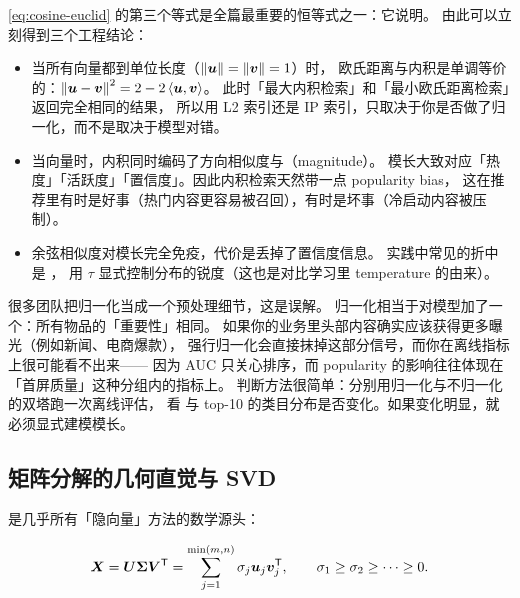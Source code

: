 \cref{eq:cosine-euclid} 的第三个等式是全篇最重要的恒等式之一：它说明。
由此可以立刻得到三个工程结论：

\begin{itemize}
  \item 当所有向量都到单位长度（$\left\lVert \bm{u} \right\rVert = \left\lVert \bm{v} \right\rVert = 1$）时，
        欧氏距离与内积是单调等价的：$\left\lVert \bm{u}-\bm{v} \right\rVert^2 = 2 - 2\left\langle \bm{u}, \bm{v} \right\rangle$。
        此时「最大内积检索」和「最小欧氏距离检索」返回完全相同的结果，
        所以用 L2 索引还是 IP 索引，只取决于你是否做了归一化，而不是取决于模型对错。
  \item 当向量时，内积同时编码了方向相似度与（magnitude）。
        模长大致对应「热度」「活跃度」「置信度」。因此内积检索天然带一点 popularity bias，
        这在推荐里有时是好事（热门内容更容易被召回），有时是坏事（冷启动内容被压制）。
  \item 余弦相似度对模长完全免疫，代价是丢掉了置信度信息。
        实践中常见的折中是 ，
        用 $\tau$ 显式控制分布的锐度（这也是对比学习里 temperature 的由来）。
\end{itemize}

\begin{insight}
很多团队把归一化当成一个预处理细节，这是误解。
归一化相当于对模型加了一个：所有物品的「重要性」相同。
如果你的业务里头部内容确实应该获得更多曝光（例如新闻、电商爆款），
强行归一化会直接抹掉这部分信号，而你在离线指标上很可能看不出来——
因为 AUC 只关心排序，而 popularity 的影响往往体现在「首屏质量」这种分组内的指标上。
判断方法很简单：分别用归一化与不归一化的双塔跑一次离线评估，
看  与 top-10 的类目分布是否变化。如果变化明显，就必须显式建模模长。
\end{insight}

\subsection{矩阵分解的几何直觉与 SVD}

 是几乎所有「隐向量」方法的数学源头：

\begin{equation}
\bm{X} = \bm{U}\bm{\Sigma}\bm{V}^{\mathsf{T}} = \sum_{j=1}^{\min(m,n)} \sigma_j \bm{u}_j \bm{v}_j^{\mathsf{T}} ,
\qquad \sigma_1 \ge \sigma_2 \ge \cdots \ge 0 .
\label{eq:svd}
\end{equation}

